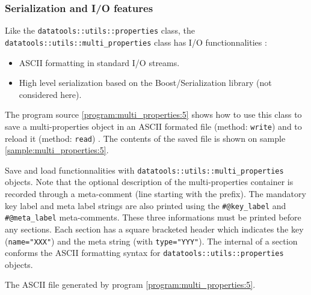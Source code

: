 \clearpage
\subsubsection{Serialization and I/O features}

Like    the     \texttt{datatools::utils::properties}    class,    the
\texttt{datatools::utils::multi\_properties}     class     has     I/O
functionnalities :

\begin{itemize}

\item ASCII formatting in standard I/O streams.

\item High level  serialization based on the Boost/Serialization library
(not considered here).

\end{itemize} 


\pn The program source  \ref{program:multi_properties:5} shows how to use
this class to save a multi-properties object 
in an ASCII formated file (method: \texttt{write}) and to reload it
(method: \texttt{read}) . 
The contents of the saved file
is shown on sample \ref{sample:multi_properties:5}.


\begin{program}[h]
\caption{Save        and       load        functionnalities       with
  \texttt{datatools::utils::multi\_properties} objects.  Note that the
  optional description  of the multi-properties  container is recorded
  through a  meta-comment (line starting  with the 
  prefix).  The  mandatory key label  and meta label strings  are also
  printed using the \texttt{\#@key\_label} and \texttt{\#@meta\_label}
  meta-comments.  These three informations  must be printed before any
  sections.   Each  section  has   a  square  bracketed  header  which
  indicates the  key (\texttt{name="XXX"})  and the meta  string (with
  \texttt{type="YYY"}). The  internal of a section  conforms the ASCII
  formatting syntax for \texttt{datatools::utils::properties} objects.
}
\label{program:multi_properties:5}
\end{program}


\begin{sample}[h]
\caption{The ASCII file generated by program  \ref{program:multi_properties:5}.  }
\label{sample:multi_properties:5}
\end{sample}


